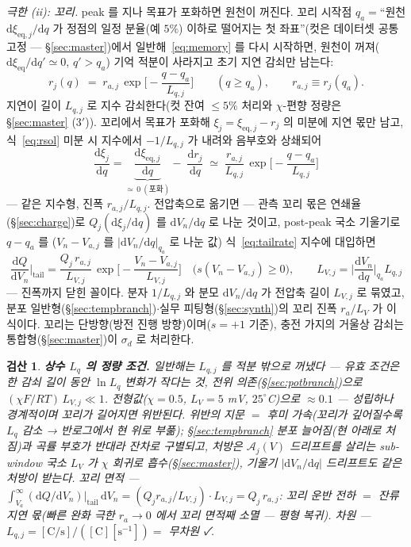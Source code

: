 \documentclass[11pt,a4paper]{article}
\newtheorem*{verifybox}{검산}
\newcommand{\dd}{\mathrm{d}}
\newcommand{\eq}{\mathrm{eq}}
\begin{document}
\emph{극한 (ii): 꼬리.} peak 를 지나 목표가 포화하면 원천이 꺼진다. 꼬리 시작점 $q_a=$``원천 $\dd\xi_{\eq,j}/\dd q$ 가 정점의 일정 분율(예 $5\%$) 이하로 떨어지는 첫 좌표''(컷은 데이터셋 공통 고정 — \S\ref{sec:master})에서 일반해~\eqref{eq:memory} 를 다시 시작하면, 원천이 꺼져($\dd\xi_{\eq}/\dd q'\simeq0$, $q'>q_a$) 기억 적분이 사라지고 초기 지연 감쇠만 남는다:
\begin{equation}
r_j(q)\;=\;r_{a,j}\,\exp\!\Big[-\frac{q-q_a}{L_{q,j}}\Big]\qquad(q\ge q_a),\qquad
r_{a,j}\equiv r_j(q_a).
\label{eq:rsol}
\end{equation}
지연이 길이 $L_{q,j}$ 로 지수 감쇠한다(컷 잔여 $\le5\%$ 처리와 $\chi$-편향 정량은 \S\ref{sec:master} (3$'$)). 꼬리에서 목표가 포화해 $\xi_j=\xi_{\eq,j}-r_j$ 의 미분에 지연 몫만 남고, 식~\eqref{eq:rsol} 미분 시 지수에서 $-1/L_{q,j}$ 가 내려와 음부호와 상쇄되어
\begin{equation}
\frac{\dd\xi_j}{\dd q}
=\underbrace{\frac{\dd\xi_{\eq,j}}{\dd q}}_{\simeq\,0\ (\text{포화})}-\;\frac{\dd r_j}{\dd q}
\;\simeq\;\frac{r_{a,j}}{L_{q,j}}\,\exp\!\Big[-\frac{q-q_a}{L_{q,j}}\Big]
\label{eq:tailrate}
\end{equation}
— 같은 지수형, 진폭 $r_{a,j}/L_{q,j}$. 전압축으로 옮기면 — 관측 꼬리 몫은 연쇄율(\S\ref{sec:charge})로 $Q_j(\dd\xi_j/\dd q)$ 를 $\dd V_n/\dd q$ 로 나눈 것이고, post-peak 국소 기울기로 $q-q_a$ 를 ($V_n-V_{a,j}$ 를 $|\dd V_n/\dd q|_{q_a}$ 로 나눈 값) 식~\eqref{eq:tailrate} 지수에 대입하면
\begin{equation}
\frac{\dd Q}{\dd V_n}\Big|_{\text{tail}}
=\frac{Q_j\,r_{a,j}}{L_{V,j}}\,
\exp\!\Big[-\frac{V_n-V_{a,j}}{L_{V,j}}\Big]\quad\big(s(V_n-V_{a,j})\ge0\big),\qquad
L_{V,j}=\Big|\frac{\dd V_n}{\dd q}\Big|_{q_a}L_{q,j}
\label{eq:tail}
\end{equation}
— 진폭까지 닫힌 꼴이다. 분자 $1/L_{q,j}$ 와 분모 $\dd V_n/\dd q$ 가 전압축 길이 $L_{V,j}$ 로 묶였고, 분포 일반형(\S\ref{sec:tempbranch})$\cdot$실무 피팅형(\S\ref{sec:synth})의 꼬리 진폭 $r_a/L_V$ 가 이 식이다. 꼬리는 단방향(방전 진행 방향)이며($s=+1$ 기준), 충전 가지의 거울상 감쇠는 통합형(\S\ref{sec:master})이 $\sigma_d$ 로 처리한다.

\begin{verifybox}
\textbf{상수 $L_q$ 의 정량 조건.} 일반해는 $L_{q,j}$ 를 적분 밖으로 꺼냈다 — 유효 조건은 한 감쇠 길이 동안 $\ln L_q$ 변화가 작다는 것, 전위 의존(\S\ref{sec:potbranch})으로 $(\chi F/RT)\,L_{V,j}\ll1$. 전형값($\chi=0.5$, $L_V=5$ mV, $25^\circ$C)으로 $\approx0.1$ — 성립하나 경계적이며 꼬리가 길어지면 위반된다. 위반의 지문 $=$ 후미 \emph{가속}(꼬리가 깊어질수록 $L_q$ 감소 → 반로그에서 현 \emph{위로} 부풂); \S\ref{sec:tempbranch} 분포 늘어짐(현 \emph{아래로} 처짐)과 곡률 부호가 반대라 잔차로 구별되고, 처방은 $\mathcal A_j(V)$ 드리프트를 살리는 sub-window 국소 $L_V$ 가 $\chi$ 회귀로 흡수(\S\ref{sec:master}), 기울기 $|\dd V_n/\dd q|$ 드리프트도 같은 처방이 받는다.
꼬리 면적 — $\int_{V_{a}}^{\infty}(\dd Q/\dd V_n)|_{\text{tail}}\,\dd V_n
=(Q_jr_{a,j}/L_{V,j})\cdot L_{V,j}=Q_j\,r_{a,j}$: 꼬리 운반 전하 $=$ 잔류 지연 몫(빠른 완화 극한 $r_a\to0$ 에서 꼬리 면적째 소멸 — 평형 복귀).
차원 — $L_{q,j}=[\mathrm{C/s}]/([\mathrm C][\mathrm{s^{-1}}])=$ 무차원 ✓.
\end{verifybox}
\end{document}
